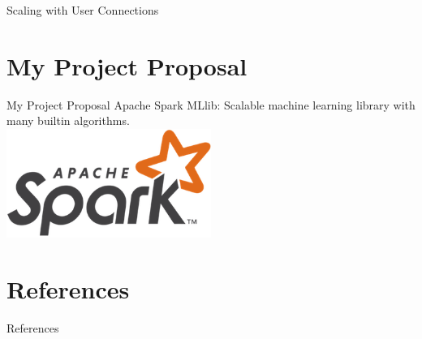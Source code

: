     \begin{frame}{Scaling with User Connections}
      \begin{table}[]
      \end{table}
      
    
    \end{frame}

  \section{My Project Proposal}

  \begin{frame}{My Project Proposal}
    \LARGE
    Apache Spark MLlib: Scalable machine learning library with many builtin algorithms. \\
    
    \includegraphics[width=0.5\textwidth]{../images/spark-logo.png}
  \end{frame}

  \section{References}
		\begin{frame}{References}
			
			
		\end{frame}


